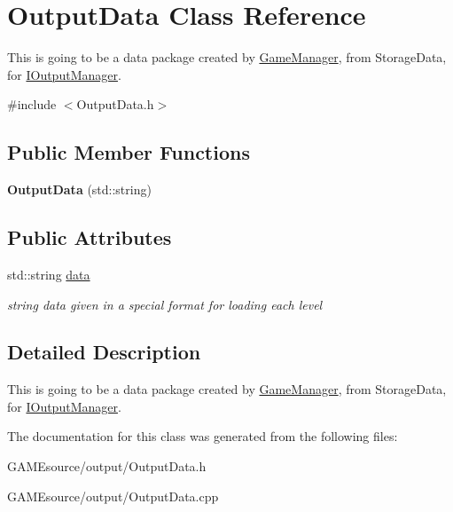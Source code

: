 \hypertarget{class_output_data}{}\section{Output\+Data Class Reference}
\label{class_output_data}


This is going to be a data package created by \mbox{\hyperlink{class_game_manager}{Game\+Manager}}, from Storage\+Data, for \mbox{\hyperlink{class_i_output_manager}{I\+Output\+Manager}}.  




{\ttfamily \#include $<$Output\+Data.\+h$>$}

\subsection*{Public Member Functions}
\begin{DoxyCompactItemize}
\item 
\mbox{\label{class_output_data_a66eec456c0579b9945a412bb919f8f08}} 
{\bfseries Output\+Data} (std\+::string)
\end{DoxyCompactItemize}
\subsection*{Public Attributes}
\begin{DoxyCompactItemize}
\item 
\mbox{\label{class_output_data_aea2c1c5aff5523a159a410ff0e06b6fa}} 
std\+::string \mbox{\hyperlink{class_output_data_aea2c1c5aff5523a159a410ff0e06b6fa}{data}}
\begin{DoxyCompactList}\small\item\em string data given in a special format for loading each level \end{DoxyCompactList}\end{DoxyCompactItemize}


\subsection{Detailed Description}
This is going to be a data package created by \mbox{\hyperlink{class_game_manager}{Game\+Manager}}, from Storage\+Data, for \mbox{\hyperlink{class_i_output_manager}{I\+Output\+Manager}}. 

The documentation for this class was generated from the following files\+:\begin{DoxyCompactItemize}
\item 
G\+A\+M\+Esource/output/Output\+Data.\+h\item 
G\+A\+M\+Esource/output/Output\+Data.\+cpp\end{DoxyCompactItemize}
